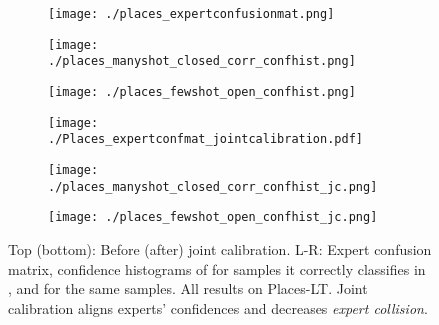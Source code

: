 \documentclass[runningheads]{llncs}
\begin{document}
\begin{figure*}[!t]
        \vspace{-1em}
        \begin{subfigure}{0.32\linewidth}
        \texttt{[image: ./places\_expertconfusionmat.png]}
        \caption{}
        \label{fig:expert collision}
        \end{subfigure}
    \begin{subfigure}{0.32\linewidth}
        \texttt{[image: ./places\_manyshot\_closed\_corr\_confhist.png]}
        \caption{}
        \label{fig:manyshotexperthist}
        \end{subfigure}
    \begin{subfigure}{0.32\linewidth}
        \texttt{[image: ./places\_fewshot\_open\_confhist.png]}
        \caption{}
        \label{fig:fewshotexperthist}
        \end{subfigure}
     \begin{subfigure}{0.32\linewidth}
        \texttt{[image: ./Places\_expertconfmat\_jointcalibration.pdf]}
        \caption{}
        \label{fig:expert collision_jc}
        \end{subfigure}
        \hspace{0.2em}
    \begin{subfigure}{0.32\linewidth}
        \texttt{[image: ./places\_manyshot\_closed\_corr\_confhist\_jc.png]}
        \caption{}
        \label{fig:manyshotexperthist_jc}
        \end{subfigure}
        \hspace{0.2em}
    \begin{subfigure}{0.32\linewidth}
        \texttt{[image: ./places\_fewshot\_open\_confhist\_jc.png]}
        \caption{}
        \label{fig:fewshotexperthist_jc}
        \end{subfigure}
    \caption{Top (bottom): Before (after) joint calibration. L-R: Expert confusion matrix, confidence histograms of  for samples it correctly classifies in , and  for the same samples. All results on Places-LT. Joint calibration aligns experts' confidences and decreases \emph{expert collision}.}
    \label{fig:discussion}
\end{figure*}
\end{document}
